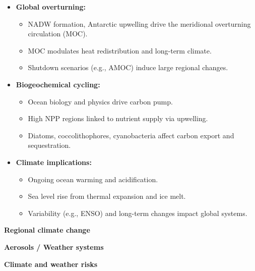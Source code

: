 \documentclass[fontsize=8pt, a4paper, landscape, fleqn]{scrartcl}
\renewcommand{\section}[1]{%
    \noindent\colorbox{sectioncolor}{%
        \parbox{\dimexpr\columnwidth-2\fboxsep}{\color{white}\textbf{#1}}}%
    \vspace{0.5mm}%
}
\begin{document}
\begin{multicols*}{3}[\raggedcolumns]
\begin{itemize}
    \item \textbf{Global overturning:}
    \begin{itemize}
        \item NADW formation, Antarctic upwelling drive the meridional overturning circulation (MOC).
        \item MOC modulates heat redistribution and long-term climate.
        \item Shutdown scenarios (e.g., AMOC) induce large regional changes.
    \end{itemize}

    \item \textbf{Biogeochemical cycling:}
    \begin{itemize}
        \item Ocean biology and physics drive carbon pump.
        \item High NPP regions linked to nutrient supply via upwelling.
        \item Diatoms, coccolithophores, cyanobacteria affect carbon export and sequestration.
    \end{itemize}

    \item \textbf{Climate implications:}
    \begin{itemize}
        \item Ongoing ocean warming and acidification.
        \item Sea level rise from thermal expansion and ice melt.
        \item Variability (e.g., ENSO) and long-term changes impact global systems.
    \end{itemize}
\end{itemize}











\section{Regional climate change}
\section{Aerosols / Weather systems}
\section{Climate and weather risks }

\end{multicols*}
\end{document}

